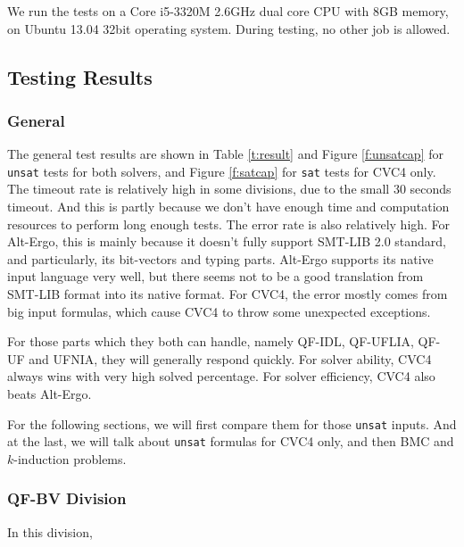 \documentclass[10pt,letter]{article}
\theoremstyle{definition}
\begin{document}
We run the tests on a Core i5-3320M 2.6GHz dual core CPU with 8GB memory, on Ubuntu 13.04 32bit operating system. During testing, no other job is allowed.



\subsection{Testing Results}

\subsubsection{General}

The general test results are shown in Table \ref{t:result} and Figure \ref{f:unsatcap} for {\tt unsat} tests for both solvers, and Figure \ref{f:satcap} for {\tt sat} tests for CVC4 only. The timeout rate is relatively high in some divisions, due to the small 30 seconds timeout. And this is partly because we don't have enough time and computation resources to perform long enough tests. The error rate is also relatively high. For Alt-Ergo, this is mainly because it doesn't fully support SMT-LIB 2.0 standard, and particularly, its bit-vectors and typing parts. Alt-Ergo supports its native input language very well, but there seems not to be a good translation from SMT-LIB format into its native format. For CVC4, the error mostly comes from big input formulas, which cause CVC4 to throw some unexpected exceptions.

For those parts which they both can handle, namely QF-IDL, QF-UFLIA, QF-UF and UFNIA, they will generally respond quickly. For solver ability, CVC4 always wins with very high solved percentage. For solver efficiency, CVC4 also beats Alt-Ergo.

For the following sections, we will first compare them for those {\tt unsat} inputs. And at the last, we will talk about {\tt unsat} formulas for CVC4 only, and then BMC and $k$-induction problems.

\subsubsection{QF-BV Division}

In this division,
\end{document}
